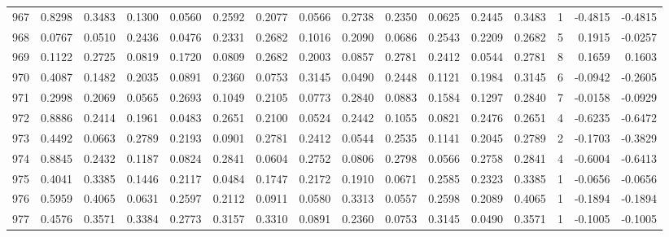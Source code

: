 \begin{tabular}{lrrrrrrrrrrrrrrr}
967 &      0.8298 &  0.3483 &  0.1300 &  0.0560 &  0.2592 &  0.2077 &  0.0566 &  0.2738 &  0.2350 &  0.0625 &   0.2445 &     0.3483 &      1 &                   -0.4815 &                    -0.4815 \\
968 &      0.0767 &  0.0510 &  0.2436 &  0.0476 &  0.2331 &  0.2682 &  0.1016 &  0.2090 &  0.0686 &  0.2543 &   0.2209 &     0.2682 &      5 &                    0.1915 &                    -0.0257 \\
969 &      0.1122 &  0.2725 &  0.0819 &  0.1720 &  0.0809 &  0.2682 &  0.2003 &  0.0857 &  0.2781 &  0.2412 &   0.0544 &     0.2781 &      8 &                    0.1659 &                     0.1603 \\
970 &      0.4087 &  0.1482 &  0.2035 &  0.0891 &  0.2360 &  0.0753 &  0.3145 &  0.0490 &  0.2448 &  0.1121 &   0.1984 &     0.3145 &      6 &                   -0.0942 &                    -0.2605 \\
971 &      0.2998 &  0.2069 &  0.0565 &  0.2693 &  0.1049 &  0.2105 &  0.0773 &  0.2840 &  0.0883 &  0.1584 &   0.1297 &     0.2840 &      7 &                   -0.0158 &                    -0.0929 \\
972 &      0.8886 &  0.2414 &  0.1961 &  0.0483 &  0.2651 &  0.2100 &  0.0524 &  0.2442 &  0.1055 &  0.0821 &   0.2476 &     0.2651 &      4 &                   -0.6235 &                    -0.6472 \\
973 &      0.4492 &  0.0663 &  0.2789 &  0.2193 &  0.0901 &  0.2781 &  0.2412 &  0.0544 &  0.2535 &  0.1141 &   0.2045 &     0.2789 &      2 &                   -0.1703 &                    -0.3829 \\
974 &      0.8845 &  0.2432 &  0.1187 &  0.0824 &  0.2841 &  0.0604 &  0.2752 &  0.0806 &  0.2798 &  0.0566 &   0.2758 &     0.2841 &      4 &                   -0.6004 &                    -0.6413 \\
975 &      0.4041 &  0.3385 &  0.1446 &  0.2117 &  0.0484 &  0.1747 &  0.2172 &  0.1910 &  0.0671 &  0.2585 &   0.2323 &     0.3385 &      1 &                   -0.0656 &                    -0.0656 \\
976 &      0.5959 &  0.4065 &  0.0631 &  0.2597 &  0.2112 &  0.0911 &  0.0580 &  0.3313 &  0.0557 &  0.2598 &   0.2089 &     0.4065 &      1 &                   -0.1894 &                    -0.1894 \\
977 &      0.4576 &  0.3571 &  0.3384 &  0.2773 &  0.3157 &  0.3310 &  0.0891 &  0.2360 &  0.0753 &  0.3145 &   0.0490 &     0.3571 &      1 &                   -0.1005 &                    -0.1005 \\

\end{tabular}

